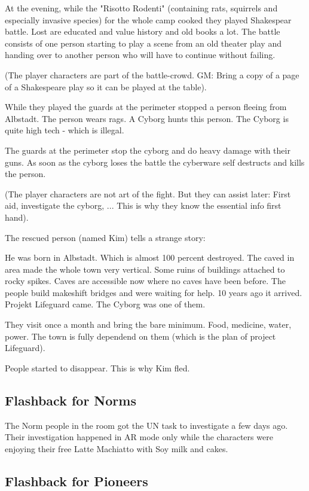 At the evening, while the "Risotto Rodenti" (containing rats, squirrels and especially invasive species) for the whole camp cooked they played Shakespear battle. Lost are educated and value history and old books a lot. The battle consists of one person starting to play a scene from an old theater play and handing over to another person who will have to continue without failing.

(The player characters are part of the battle-crowd. GM: Bring a copy of a page of a Shakespeare play so it can be played at the table).

While they played the guards at the perimeter stopped a person fleeing from Albstadt. The person wears rags. A Cyborg hunts this person. The Cyborg is quite high tech - which is illegal.

The guards at the perimeter stop the cyborg and do heavy damage with their guns. As soon as the cyborg loses the battle the cyberware self destructs and kills the person.

(The player characters are not art of the fight. But they can assist later: First aid, investigate the cyborg, ... This is why they know the essential info first hand).

The rescued person (named Kim) tells a strange story:

He was born in Albstadt. Which is almost 100 percent destroyed. The caved in area made the whole town very vertical. Some ruins of buildings attached to rocky spikes. Caves are accessible now where no caves have been before. The people build makeshift bridges and were waiting for help. 10 years ago it arrived. Projekt Lifeguard came. The Cyborg was one of them.

They visit once a month and bring the bare minimum. Food, medicine, water, power. The town is fully dependend on them (which is the plan of project Lifeguard).

People started to disappear. This is why Kim fled.

\subsection{Flashback for Norms}

The Norm people in the room got the UN task to investigate a few days ago. Their investigation happened in AR mode only while the characters were enjoying their free Latte Machiatto with Soy milk and cakes.



\subsection{Flashback for Pioneers}

